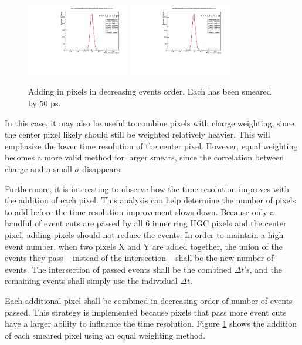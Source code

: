 \documentclass[12pt]{article}
\begin{document}
\begin{figure}[h]
	\includegraphics[width=0.4\textwidth]{SKIROC/SKIROC_6_Pixels50.pdf}
	\includegraphics[width=0.4\textwidth]{SKIROC/SKIROC_7_Pixels50.pdf}
	\caption{Adding in pixels in decreasing events order.
		Each has been smeared by 50 ps.}
	\label{fig:50psAll}
\end{figure}

In this case, it may also be useful to combine pixels with charge weighting, since the center pixel likely should still be weighted relatively heavier.
This will emphasize the lower time resolution of the center pixel.
However, equal weighting becomes a more valid method for larger smears, since the correlation between charge and a small $\sigma$ disappears.

Furthermore, it is interesting to observe how the time resolution improves with the addition of each pixel. 
This analysis can help determine the number of pixels to add before the time resolution improvement slows down.
Because only a handful of event cuts are passed by all 6 inner ring HGC pixels and the center pixel, adding pixels should not reduce the events.
In order to maintain a high event number, when two pixels X and Y are added together, the union of the events they pass -- instead of the intersection -- shall be the new number of events.
The intersection of passed events shall be the combined $\Delta t$'s, and the remaining events shall simply use the individual $\Delta t$.

Each additional pixel shall be combined in decreasing order of number of events passed.
This strategy is implemented because pixels that pass more event cuts have a larger ability to influence the time resolution.
Figure \ref{fig:50psAll} shows the addition of each smeared pixel using an equal weighting method. 
\end{document}
